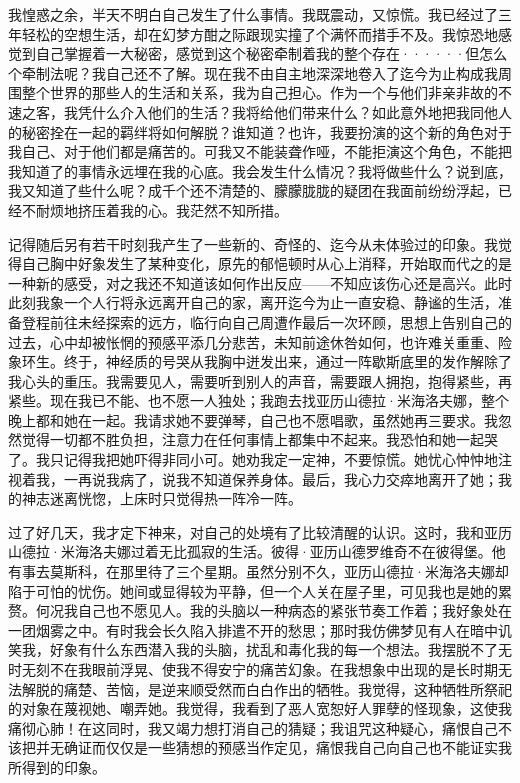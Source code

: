 \documentclass[12pt, UTF8]{ctexbook}
\begin{document}
\par 我惶惑之余，半天不明白自己发生了什么事情。我既震动，又惊慌。我已经过了三年轻松的空想生活，却在幻梦方酣之际跟现实撞了个满怀而措手不及。我惊恐地感觉到自己掌握着一大秘密，感觉到这个秘密牵制着我的整个存在······但怎么个牵制法呢？我自己还不了解。现在我不由自主地深深地卷入了迄今为止构成我周围整个世界的那些人的生活和关系，我为自己担心。作为一个与他们非亲非故的不速之客，我凭什么介入他们的生活？我将给他们带来什么？如此意外地把我同他人的秘密拴在一起的羁绊将如何解脱？谁知道？也许，我要扮演的这个新的角色对于我自己、对于他们都是痛苦的。可我又不能装聋作哑，不能拒演这个角色，不能把我知道了的事情永远埋在我的心底。我会发生什么情况？我将做些什么？说到底，我又知道了些什么呢？成千个还不清楚的、朦朦胧胧的疑团在我面前纷纷浮起，已经不耐烦地挤压着我的心。我茫然不知所措。
\par 记得随后另有若干时刻我产生了一些新的、奇怪的、迄今从未体验过的印象。我觉得自己胸中好象发生了某种变化，原先的郁悒顿时从心上消释，开始取而代之的是一种新的感受，对之我还不知道该如何作出反应——不知应该伤心还是高兴。此时此刻我象一个人行将永远离开自己的家，离开迄今为止一直安稳、静谧的生活，准备登程前往未经探索的远方，临行向自己周遭作最后一次环顾，思想上告别自己的过去，心中却被怅惘的预感平添几分悲苦，未知前途休咎如何，也许难关重重、险象环生。终于，神经质的号哭从我胸中迸发出来，通过一阵歇斯底里的发作解除了我心头的重压。我需要见人，需要听到别人的声音，需要跟人拥抱，抱得紧些，再紧些。现在我已不能、也不愿一人独处；我跑去找亚历山德拉·米海洛夫娜，整个晚上都和她在一起。我请求她不要弹琴，自己也不愿唱歌，虽然她再三要求。我忽然觉得一切都不胜负担，注意力在任何事情上都集中不起来。我恐怕和她一起哭了。我只记得我把她吓得非同小可。她劝我定一定神，不要惊慌。她忧心忡忡地注视着我，一再说我病了，说我不知道保养身体。最后，我心力交瘁地离开了她；我的神志迷离恍惚，上床时只觉得热一阵冷一阵。
\par 过了好几天，我才定下神来，对自己的处境有了比较清醒的认识。这时，我和亚历山德拉·米海洛夫娜过着无比孤寂的生活。彼得·亚历山德罗维奇不在彼得堡。他有事去莫斯科，在那里待了三个星期。虽然分别不久，亚历山德拉·米海洛夫娜却陷于可怕的忧伤。她间或显得较为平静，但一个人关在屋子里，可见我也是她的累赘。何况我自己也不愿见人。我的头脑以一种病态的紧张节奏工作着；我好象处在一团烟雾之中。有时我会长久陷入排遣不开的愁思；那时我仿佛梦见有人在暗中讥笑我，好象有什么东西潜入我的头脑，扰乱和毒化我的每一个想法。我摆脱不了无时无刻不在我眼前浮晃、使我不得安宁的痛苦幻象。在我想象中出现的是长时期无法解脱的痛楚、苦恼，是逆来顺受然而白白作出的牺牲。我觉得，这种牺牲所祭祀的对象在蔑视她、嘲弄她。我觉得，我看到了恶人宽恕好人罪孽的怪现象，这使我痛彻心肺！在这同时，我又竭力想打消自己的猜疑；我诅咒这种疑心，痛恨自己不该把并无确证而仅仅是一些猜想的预感当作定见，痛恨我自己向自己也不能证实我所得到的印象。
\end{document}
